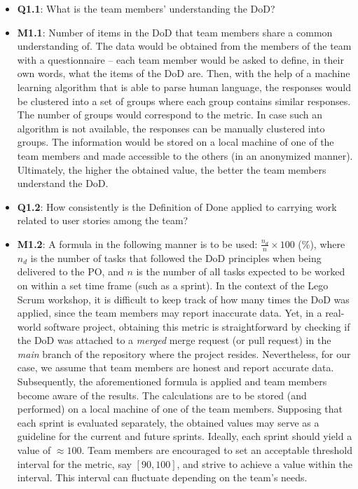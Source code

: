 \documentclass[conference]{IEEEtran}
\begin{document}
\begin{itemize}
  \item \textbf{Q1.1}: What is the team members' understanding the DoD?
  \item \textbf{M1.1}: Number of items in the DoD that team members share a
    common understanding of. The data would be obtained from the members of the
    team with a questionnaire -- each team member would be asked to define, in
    their own words, what the items of the DoD are. Then, with the help of a
    machine learning algorithm that is able to parse human language, the
    responses would be clustered into a set of groups where each group contains
    similar responses. The number of groups would correspond to the metric. In
    case such an algorithm is not available, the responses can be manually
    clustered into groups. The information would be stored on a local machine
    of one of the team members and made accessible to the others (in an
    anonymized manner). Ultimately, the higher the obtained value, the better
    the team members understand the DoD.
  \item \textbf{Q1.2}: How consistently is the Definition of Done applied to
    carrying work related to user stories among the team?
  \item \textbf{M1.2}: A formula in the following manner is to be used:
    $\frac{n_d}{n} \times 100$ (\%), where $n_d$ is the number of tasks that
    followed the DoD principles when being delivered to the PO, and $n$ is the
    number of all tasks expected to be worked on within a set time frame (such
    as a
    sprint). In the context of the Lego Scrum workshop, it is difficult to keep
    track of how many times the DoD was applied, since the team members may
    report inaccurate data. Yet, in a real-world software project, obtaining
    this metric is straightforward by checking if the DoD was attached to a
    \textit{merged} merge request (or pull request) in the \textit{main}
    branch of the repository where the project resides.
    Nevertheless, for our case, we
    assume that team members are honest and report accurate data.
    Subsequently, the aforementioned formula is applied and team members become
    aware of the results. The calculations are to be stored (and
    performed) on a local machine of one of the team members. Supposing that
    each sprint is evaluated separately, the obtained values may serve as a
    guideline for the current and future sprints.
    Ideally, each sprint
    should yield a value of $\approx 100$. Team members are encouraged to set
    an acceptable threshold interval for the metric, say $[90, 100]$, and
    strive to achieve a value within the interval. This interval can fluctuate
    depending on the team's needs.
\end{itemize}
\end{document}
